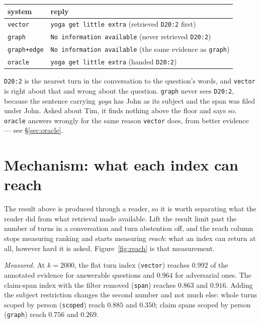 \documentclass[11pt]{article}
\newcommand{\arm}[1]{\texttt{#1}}
\begin{document}
\begin{center}
\small
\begin{tabular}{@{}ll@{}}
\toprule
system & reply \\
\midrule
\arm{vector} & \texttt{yoga get little extra} \quad (retrieved \texttt{D20:2} first) \\
\arm{graph}  & \texttt{No information available} \quad (never retrieved \texttt{D20:2}) \\
\arm{graph+edge} & \texttt{No information available} \quad (the same evidence as \arm{graph}) \\
\arm{oracle} & \texttt{yoga get little extra} \quad (handed \texttt{D20:2}) \\
\bottomrule
\end{tabular}
\end{center}

\texttt{D20:2} is the nearest turn in the conversation to the question's words,
and \arm{vector} is right about that and wrong about the question.
\arm{graph} never sees \texttt{D20:2}, because the sentence carrying
\emph{yoga} has John as its subject and the span was filed under John. Asked
about Tim, it finds nothing above the floor and says so. \arm{oracle} answers
wrongly for the same reason \arm{vector} does, from better evidence --- see
\S\ref{sec:oracle}.

\section{Mechanism: what each index can reach}
\label{sec:mechanism}

The result above is produced through a reader, so it is worth separating what
the reader did from what retrieval made available. Lift the result limit past
the number of turns in a conversation and turn abstention off, and the reach
column stops measuring ranking and starts measuring \emph{reach}: what an index
can return at all, however hard it is asked. Figure~\ref{fig:reach} is that
measurement.

\emph{Measured.} At $k=2000$, the flat turn index (\arm{vector}) reaches
$0.992$ of the annotated evidence for answerable questions and $0.964$ for
adversarial ones. The claim-span index with the filter removed (\arm{span})
reaches $0.863$ and $0.916$. Adding the subject restriction changes the second
number and not much else: whole turns scoped by person (\arm{scoped}) reach
$0.885$ and $0.350$; claim spans scoped by person (\arm{graph}) reach $0.756$
and $0.269$.
\end{document}
